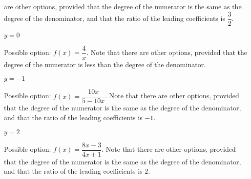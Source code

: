 \begin{exercises}
\begin{problem}
\begin{multicols}{4}
\begin{subproblem}
\begin{shortsolution}
 			are other options, provided that the degree of the numerator is the same as the degree
 			of the denominator, and that the ratio of the leading 
 			coefficients is $\dfrac{3}{2}$.
 		\end{shortsolution}
 	\end{subproblem}
 	\begin{subproblem}
 		$y=0$ 
 		\begin{shortsolution}
 			Possible option: $f(x)=\dfrac{4}{x}$. Note that there
 			are other options, provided that the degree of the numerator is less than the degree
 			of the denominator.
 		\end{shortsolution}
 	\end{subproblem}
 	\begin{subproblem}
 		$y=-1$ 
 		\begin{shortsolution}
 			Possible option: $f(x)=\dfrac{10x}{5-10x}$. Note that there
 			are other options, provided that the degree of the numerator is the same as the degree
 			of the denominator, and that the ratio of the leading 
 			coefficients is $-1$.
 		\end{shortsolution}
 	\end{subproblem}
 	\begin{subproblem}
 		$y=2$ 
 		\begin{shortsolution}
 			Possible option: $f(x)=\dfrac{8x-3}{4x+1}$. Note that there
 			are other options, provided that the degree of the numerator is the same as the degree
 			of the denominator, and that the ratio of the leading 
 			coefficients is $2$.
 		\end{shortsolution}
 	\end{subproblem}
 \end{multicols}
 \end{problem}
  	  

\end{exercises}
